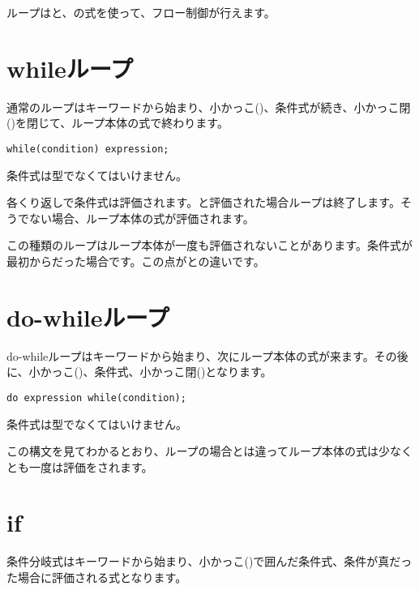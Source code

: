 ループはと、の式を使って、フロー制御が行えます。

\section{whileループ}
\label{expression-while}

通常のループはキーワードから始まり、小かっこ(\expr{(})、条件式が続き、小かっこ閉(\expr{)})を閉じて、ループ本体の式で終わります。

\begin{lstlisting}
while(condition) expression;
\end{lstlisting}

条件式は型でなくてはいけません。

各くり返しで条件式は評価されます。と評価された場合ループは終了します。そうでない場合、ループ本体の式が評価されます。


この種類のループはループ本体が一度も評価されないことがあります。条件式が最初からだった場合です。この点がとの違いです。

\section{do-whileループ}
\label{expression-do-while}

do-whileループはキーワードから始まり、次にループ本体の式が来ます。その後に、小かっこ(\expr{(})、条件式、小かっこ閉(\expr{)})となります。

\begin{lstlisting}
do expression while(condition);
\end{lstlisting}

条件式は型でなくてはいけません。

この構文を見てわかるとおり、ループの場合とは違ってループ本体の式は少なくとも一度は評価をされます。

\section{if}
\label{expression-if}

条件分岐式はキーワードから始まり、小かっこ(\expr{()})で囲んだ条件式、条件が真だった場合に評価される式となります。

